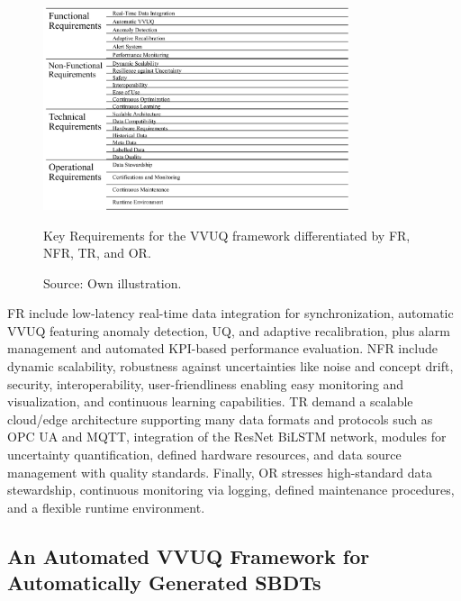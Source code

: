 \begin{figure}[htbp]
  \centering
  \includegraphics[width=0.8\textwidth]{figures/req.png}
  \caption[Key Requirements for VVUQ]{Key Requirements for the VVUQ framework differentiated by FR, NFR, TR, and OR. }
  \caption*{Source: Own illustration.}
  \label{fig:requirements}
\end{figure}

FR include low-latency real-time data integration for synchronization, automatic VVUQ featuring anomaly detection, UQ, and adaptive recalibration, plus alarm management and automated KPI-based performance evaluation. NFR include dynamic scalability, robustness against uncertainties like noise and concept drift, security, interoperability, user-friendliness enabling easy monitoring and visualization, and continuous learning capabilities. TR demand a scalable cloud/edge architecture supporting many data formats and protocols such as OPC UA and MQTT, integration of the ResNet BiLSTM network, modules for uncertainty quantification, defined hardware resources, and data source management with quality standards. Finally, OR stresses high-standard data stewardship, continuous monitoring via logging, defined maintenance procedures, and a flexible runtime environment.

\subsection{An Automated VVUQ Framework for Automatically Generated SBDTs}
\label{sec:framework}

